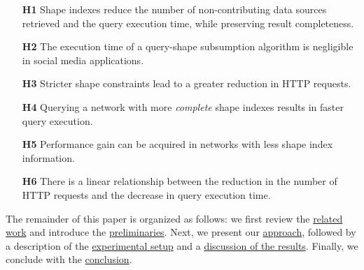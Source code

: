 \begin{itemize}
    \item[\textbf{H1}] Shape indexes reduce the number of non-contributing data sources retrieved and the query execution time, while preserving result completeness.
    \item[\textbf{H2}] The execution time of a query-shape subsumption algorithm is negligible in social media applications.
    \item[\textbf{H3}] Stricter shape constraints lead to a greater reduction in HTTP requests.
    \item[\textbf{H4}] Querying a network with more \emph{complete} shape indexes results in faster query execution.
    \item[\textbf{H5}] Performance gain can be acquired in networks with less shape index information.
    \item[\textbf{H6}] There is a linear relationship between the reduction in the number of HTTP requests and the decrease in query execution time.
\end{itemize}

The remainder of this paper is organized as follows: 
we first review the \hyperref[sec:related_work]{related work} and introduce the \hyperref[sec:preliminaries]{preliminaries}. 
Next, we present our \hyperref[sec:approach]{approach}, followed by a description of the \hyperref[sec:experiment]{experimental setup} and a \hyperref[sec:result]{discussion of the results}. 
Finally, we conclude with the \hyperref[sec:conclusion]{conclusion}.

